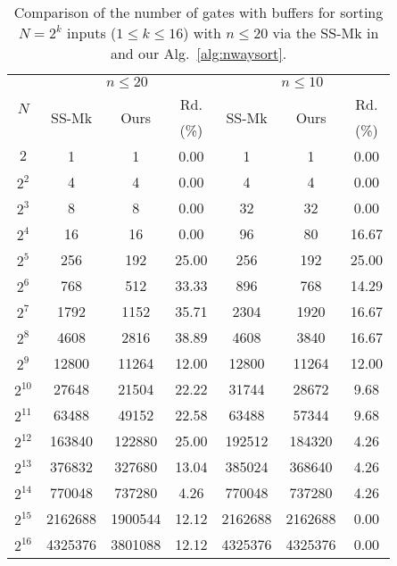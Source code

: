 \documentclass[10pt,journal,cspaper,compsoc]{IEEEtran}
\begin{document}
\begin{table}[!t]
\caption{Comparison of the number of gates with buffers for sorting $N=2^k$ inputs ($1\le k \le 16$) with $n\le 20$ via the SS-Mk in \cite{gao1997sloping} and our Alg.~\ref{alg:nwaysort}.}\label{tab:comp_n2010TG}
\begin{center}
\begin{tabular}{|c|c|c|c|c|c|c|}
\hline
\multirow{3}{*}{$N$} & \multicolumn{3}{c|}{$n\le 20$} & \multicolumn{3}{c|}{$n\le 10$}\\
\cline{2-7}
& \multirow{2}{*}{SS-Mk} & \multirow{2}{*}{Ours} & Rd. & \multirow{2}{*}{SS-Mk} & \multirow{2}{*}{Ours} & Rd. \\
& & & (\%) & & & (\%)\\
\hline
$2$	&	1   &   1	&	0.00	    &	1	 &	 1  &   0.00\\
\hline
$2^2$	&	4   &   4	&	0.00		&	4    &   4	&	0.00\\
\hline
$2^3$	&	8   &     8	&	0.00	    &	32   &   32	&	0.00\\
\hline
$2^4$	&	16  &   16	&	0.00		&	96	&	 80  &    16.67\\
\hline
$2^5$	&	256  &   192	&	25.00		&	256 & 192	&	25.00\\
\hline
$2^6$	&	768    &   512	&	33.33		&	896	&	768 & 14.29\\
\hline
$2^7$	&	1792   &   1152	&	35.71		&	2304	&	1920 & 16.67\\
\hline
$2^8$	&	4608	&    2816	&	38.89	&	4608	&	3840 & 16.67	\\
\hline
$2^9$	&	12800   &   11264	&	12.00		&	12800	&	11264    & 12.00\\
\hline
$2^{10}$	&	27648   &   21504	&	22.22		&	31744	&	28672 & 9.68\\
\hline
$2^{11}$	&	63488	&   49152	&	22.58 	&	63488	&	57344 & 9.68\\
\hline
$2^{12}$	&	163840	&   122880	&	25.00 	&	192512	&	184320 & 4.26\\
\hline
$2^{13}$	&	376832	&   327680	&	13.04	&	385024	&	368640 & 4.26\\
\hline
$2^{14}$   &   770048  &   737280  &   4.26   &   770048  &  737280 &  4.26\\
\hline
$2^{15}$   &   2162688  &   1900544  &   12.12   &   2162688  &  2162688 &  0.00 \\
\hline
$2^{16}$   &   4325376  &   3801088  &   12.12   &   4325376  &  4325376 &  0.00 \\
\hline
\end{tabular}
\end{center}
\end{table}
\end{document}
